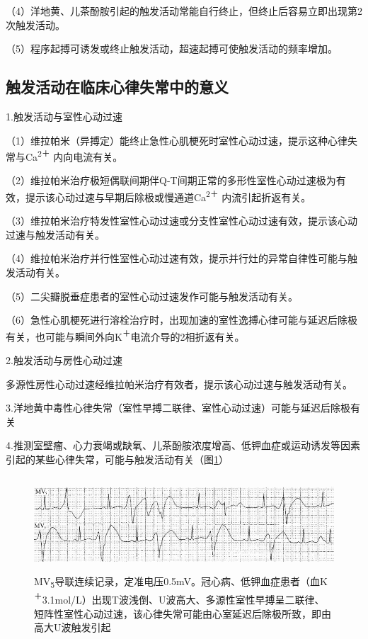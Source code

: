 （4）洋地黄、儿茶酚胺引起的触发活动常能自行终止，但终止后容易立即出现第2次触发活动。

（5）程序起搏可诱发或终止触发活动，超速起搏可使触发活动的频率增加。

\protect\hypertarget{text00024.htmlux5cux23subid305}{}{}

\subsection{触发活动在临床心律失常中的意义}

1.触发活动与室性心动过速

（1）维拉帕米（异搏定）能终止急性心肌梗死时室性心动过速，提示这种心律失常与Ca\textsuperscript{2＋}
内向电流有关。

（2）维拉帕米治疗极短偶联间期伴Q-T间期正常的多形性室性心动过速极为有效，提示该心动过速与早期后除极或慢通道Ca\textsuperscript{2＋}
内流引起折返有关。

（3）维拉帕米治疗特发性室性心动过速或分支性室性心动过速有效，提示该心动过速与触发活动有关。

（4）维拉帕米治疗并行性室性心动过速有效，提示并行灶的异常自律性可能与触发活动有关。

（5）二尖瓣脱垂症患者的室性心动过速发作可能与触发活动有关。

（6）急性心肌梗死进行溶栓治疗时，出现加速的室性逸搏心律可能与延迟后除极有关，也可能与瞬间外向K\textsuperscript{＋}电流介导的2相折返有关。

2.触发活动与房性心动过速

多源性房性心动过速经维拉帕米治疗有效者，提示该心动过速与触发活动有关。

3.洋地黄中毒性心律失常（室性早搏二联律、室性心动过速）可能与延迟后除极有关

4.推测室壁瘤、心力衰竭或缺氧、儿茶酚胺浓度增高、低钾血症或运动诱发等因素引起的某些心律失常，可能与触发活动有关（图\ref{fig17-2}）

\begin{figure}[!htbp]
 \centering
 \includegraphics[width=5.58333in,height=1.39583in]{./images/Image00301.jpg}
 \captionsetup{justification=centering}
 \caption{MV\textsubscript{5}导联连续记录，定准电压0.5mV。冠心病、低钾血症患者（血K\textsuperscript{＋}3.1mol/L）出现T波浅倒、U波高大、多源性室性早搏呈二联律、短阵性室性心动过速，该心律失常可能由心室延迟后除极所致，即由高大U波触发引起}
 \label{fig17-2}
  \end{figure} 


